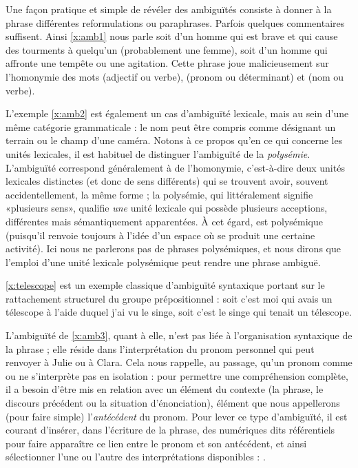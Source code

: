 \begin{refsegment}
Une façon pratique et simple de révéler des ambiguïtés consiste à donner à la phrase  différentes reformulations ou paraphrases.  Parfois quelques commentaires suffisent.  Ainsi \ref{x:amb1} nous parle soit d'un homme qui est brave et qui cause des tourments à quelqu'un (probablement une femme), soit d'un homme qui affronte une tempête ou une agitation.  Cette phrase joue malicieusement sur l'homonymie des mots  (adjectif ou verbe),  (pronom ou déterminant) et  (nom ou verbe).

L'exemple \ref{x:amb2} est également un cas d'ambiguïté lexicale, mais au sein d'une même catégorie grammaticale : le nom  peut être compris comme désignant un terrain ou le champ d'une caméra. 
Notons à ce propos qu'en ce qui concerne les unités lexicales, il est habituel de distinguer l'ambiguïté de la \emph{polysémie}.\label{p.polysem} 
L'ambiguïté correspond généralement à de l'homonymie, c'est-à-dire deux unités lexicales distinctes (et donc de sens différents) qui se trouvent avoir, souvent accidentellement, la même forme ; la polysémie, qui littéralement signifie «plusieurs sens», qualifie \emph{une} unité lexicale qui possède plusieurs acceptions, différentes mais sémantiquement apparentées. 
À cet égard,  est polysémique (puisqu'il renvoie toujours à l'idée d'un espace où se produit une certaine activité). Ici nous ne parlerons pas de phrases polysémiques, et nous dirons que l'emploi d'une unité lexicale polysémique peut rendre une phrase ambiguë.

\ref{x:telescope} est un exemple classique d'ambiguïté syntaxique portant sur le rattachement structurel du groupe prépositionnel %
 : soit c'est moi qui avais un télescope à l'aide duquel j'ai vu le singe, %
soit c'est le singe qui tenait un télescope. %

L'ambiguïté de \ref{x:amb3}, quant à elle, n'est pas liée à l'organisation syntaxique de la phrase ; elle réside dans l'interprétation du pronom personnel  qui peut renvoyer à Julie ou à Clara.  Cela nous rappelle, au passage, qu'un pronom comme  ou  ne s'interprète pas en isolation :  pour permettre une compréhension complète, il a besoin d'être mis en relation avec un élément du contexte (la phrase, le discours précédent ou la situation d'énonciation), élément que nous appellerons (pour faire simple) l'\emph{antécédent} du pronom.
Pour lever ce type d'ambiguïté, il est courant d'insérer, dans l'écriture de la phrase, des  numériques dits référentiels pour faire apparaître ce lien entre le pronom et son antécédent, et ainsi sélectionner l'une ou l'autre des interprétations disponibles :  {\vs} .


\end{refsegment}
